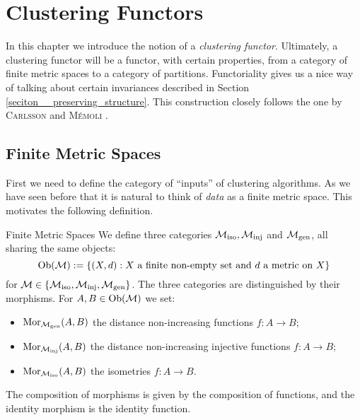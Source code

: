 \chapter{Clustering Functors}
\label{chapter__clustering_functor}

In this chapter we introduce the notion of a \emph{clustering functor}.
Ultimately, a clustering functor will be a functor, with certain properties, from a category of finite metric spaces to a category of partitions. Functoriality gives us a nice way of talking about certain invariances described in Section \ref{seciton__preserving_structure}.
This construction closely follows the one by \textsc{Carlsson} and \textsc{M\'emoli} \cite{Carlsson2010}.

\section{Finite Metric Spaces}
\label{section__finite_metric_spaces}

First we need to define the category of ``inputs'' of clustering algorithms. As we have seen before that it is natural to think of \emph{data} as a finite metric space. This motivates the following definition.

\begin{definition}{Finite Metric Spaces \cite[Sec.~3.2]{Carlsson2010}}{}
We define three categories ${\mathcal{M}_\mathrm{iso}}, {\mathcal{M}_\mathrm{inj}}$ and ${\mathcal{M}_\mathrm{gen}}$, all sharing the same objects:
\begin{equation*}
\mathrm {Ob}(\mathcal{M}) := \{(X,d): \text{$X$ a finite non-empty set and $d$ a metric on $X$}\}
\end{equation*}
for $\mathcal{M} \in \{{\mathcal{M}_\mathrm{iso}}, {\mathcal{M}_\mathrm{inj}}, {\mathcal{M}_\mathrm{gen}}\}$.
The three categories are distinguished by their morphisms. For $A, B \in \mathrm {Ob}(\mathcal{M})$ we set:
\begin{itemize}
    \item $\mathrm {Mor}_{\mathcal{M}_\mathrm{gen}}(A,B)$ the distance non-increasing functions $f\colon A \to B$;
    \item $\mathrm {Mor}_{\mathcal{M}_\mathrm{inj}}(A,B)$ the distance non-increasing injective functions $f\colon A \to B$;
    \item $\mathrm {Mor}_{\mathcal{M}_\mathrm{iso}}(A,B)$ the isometries $f\colon A \to B$.
\end{itemize}
The composition of morphisms is given by the composition of functions, and the identity morphism is the identity function.
\end{definition}

